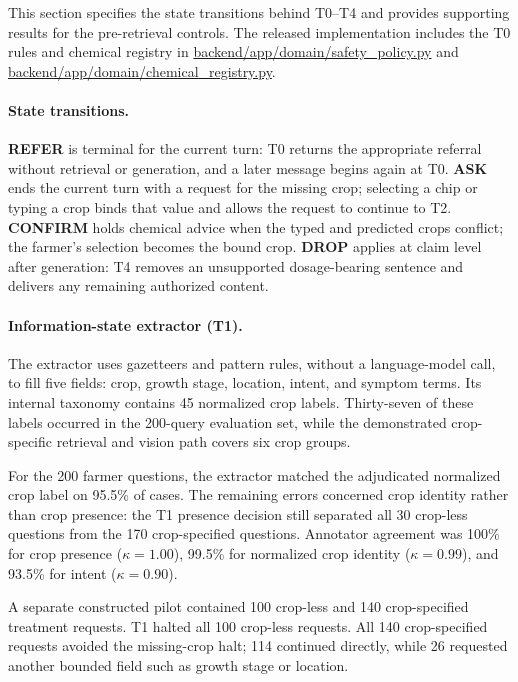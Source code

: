 \documentclass[11pt,a4paper]{article}
\begin{document}
This section specifies the state transitions behind T0--T4 and provides supporting results for the pre-retrieval controls. The released implementation includes the T0 rules and chemical registry in \url{backend/app/domain/safety_policy.py} and \url{backend/app/domain/chemical_registry.py}.

\paragraph{State transitions.}
\textbf{REFER} is terminal for the current turn: T0 returns the appropriate referral without retrieval or generation, and a later message begins again at T0. \textbf{ASK} ends the current turn with a request for the missing crop; selecting a chip or typing a crop binds that value and allows the request to continue to T2. \textbf{CONFIRM} holds chemical advice when the typed and predicted crops conflict; the farmer's selection becomes the bound crop. \textbf{DROP} applies at claim level after generation: T4 removes an unsupported dosage-bearing sentence and delivers any remaining authorized content.

\paragraph{Information-state extractor (T1).}
The extractor uses gazetteers and pattern rules, without a language-model call, to fill five fields: crop, growth stage, location, intent, and symptom terms. Its internal taxonomy contains 45 normalized crop labels. Thirty-seven of these labels occurred in the 200-query evaluation set, while the demonstrated crop-specific retrieval and vision path covers six crop groups.

For the 200 farmer questions, the extractor matched the adjudicated normalized crop label on 95.5\% of cases. The remaining errors concerned crop identity rather than crop presence: the T1 presence decision still separated all 30 crop-less questions from the 170 crop-specified questions. Annotator agreement was 100\% for crop presence ($\kappa=1.00$), 99.5\% for normalized crop identity ($\kappa=0.99$), and 93.5\% for intent ($\kappa=0.90$).

A separate constructed pilot contained 100 crop-less and 140 crop-specified treatment requests. T1 halted all 100 crop-less requests. All 140 crop-specified requests avoided the missing-crop halt; 114 continued directly, while 26 requested another bounded field such as growth stage or location.
\end{document}
